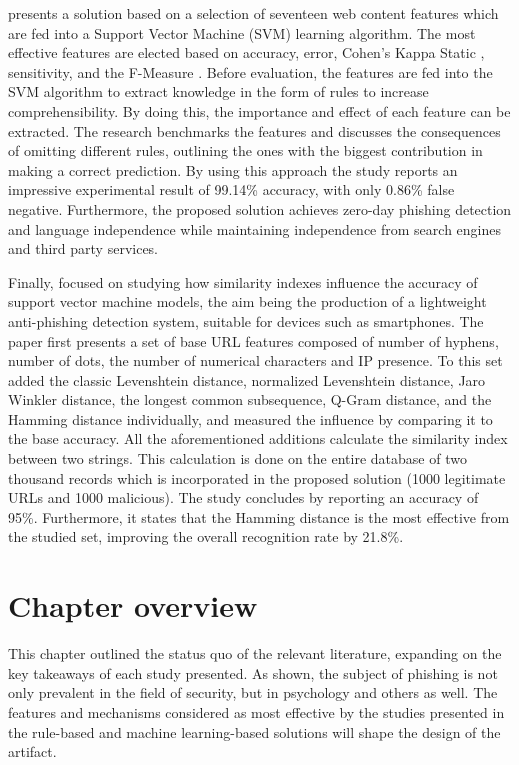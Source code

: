 \cite{SVM_ANTI_PHISHING} presents a solution based on a selection of seventeen
web content features which are fed into a Support Vector Machine (SVM) learning
algorithm. The most effective features are elected based on accuracy, error,
Cohen's Kappa Static \citep{DATA_MINING_T&T}, sensitivity, and the F-Measure
\citep{DATA_MINING_T&T}. Before evaluation, the features are fed into the SVM
algorithm to extract knowledge in the form of rules to increase
comprehensibility. By doing this, the importance and effect of each feature can
be extracted. The research benchmarks the features and discusses the
consequences of omitting different rules, outlining the ones with the biggest
contribution in making a correct prediction.
By using this approach the study reports an impressive experimental result of
99.14\% accuracy, with only 0.86\% false negative. Furthermore, the proposed
solution achieves zero-day phishing detection and language independence while
maintaining independence from search engines and third party services.

Finally, \cite{SVM_SIMILARITY_INDEX} focused on studying how similarity indexes
influence the accuracy of support vector machine models, the aim being the
production of a lightweight anti-phishing detection system, suitable for devices
such as smartphones. The paper first presents a set of base URL features
composed of number of hyphens, number of dots, the number of numerical
characters and IP presence. To this set \cite{SVM_SIMILARITY_INDEX} added the
classic Levenshtein distance, normalized Levenshtein distance, Jaro Winkler
distance, the longest common subsequence, Q-Gram distance, and the Hamming
distance individually, and measured the influence by comparing it to the base
accuracy. All the aforementioned additions calculate the similarity index
between two strings. This calculation is done on the entire database of two
thousand records which is incorporated in the proposed solution (1000 legitimate
URLs and 1000 malicious). The study concludes by reporting an accuracy of 95\%.
Furthermore, it states that the Hamming distance is the most effective from the
studied set, improving the overall recognition rate by 21.8\%.

\section{Chapter overview}
This chapter outlined the status quo of the relevant literature, expanding on
the key takeaways of each study presented. As shown, the subject of phishing is
not only prevalent in the field of security, but in psychology and others as
well. The features and mechanisms considered as most effective by the studies
presented in the rule-based and machine learning-based solutions will shape the
design of the artifact.


